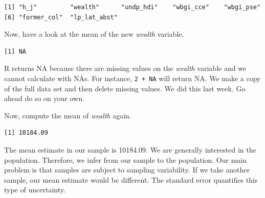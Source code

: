 \documentclass[]{article}
\newenvironment{Shaded}{\begin{snugshade}}{\end{snugshade}}
\newcommand{\KeywordTok}[1]{\textcolor[rgb]{0.13,0.29,0.53}{\textbf{#1}}}
\newcommand{\StringTok}[1]{\textcolor[rgb]{0.31,0.60,0.02}{#1}}
\newcommand{\CommentTok}[1]{\textcolor[rgb]{0.56,0.35,0.01}{\textit{#1}}}
\newcommand{\OperatorTok}[1]{\textcolor[rgb]{0.81,0.36,0.00}{\textbf{#1}}}
\newcommand{\NormalTok}[1]{#1}
\theoremstyle{definition}
\theoremstyle{definition}
\theoremstyle{definition}
\theoremstyle{remark}
\begin{document}
\begin{verbatim}
[1] "h_j"         "wealth"      "undp_hdi"    "wbgi_cce"    "wbgi_pse"   
[6] "former_col"  "lp_lat_abst"
\end{verbatim}

Now, have a look at the mean of the new \emph{wealth} variable.

\begin{Shaded}
\end{Shaded}

\begin{verbatim}
[1] NA
\end{verbatim}

R returns NA because there are missing values on the \emph{wealth}
variable and we cannot calculate with NAs. For instance,
\texttt{2\ +\ NA} will return NA. We make a copy of the full data set
and then delete missing values. We did this last week. Go ahead do so on
your own.

\begin{Shaded}
\end{Shaded}

Now, compute the mean of \emph{wealth} again.

\begin{Shaded}
\end{Shaded}

\begin{verbatim}
[1] 10184.09
\end{verbatim}

The mean estimate in our sample is 10184.09. We are generally interested
in the population. Therefore, we infer from our sample to the
population. Our main problem is that samples are subject to sampling
variability. If we take another sample, our mean estimate would be
different. The standard error quantifies this type of uncertainty.
\end{document}
